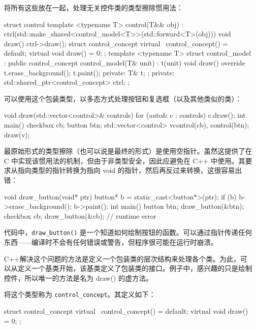 将所有这些放在一起，处理无关控件类的类型擦除惯用法：

\begin{cpp}
struct control
{
    template <typename T>
    control(T&& obj) :
    ctrl(std::make_shared<control_model<T>>(std::forward<T>(obj)))
    {
    }
    void draw()
    {
        ctrl->draw();
    }
    struct control_concept
    {
        virtual ~control_concept() = default;
        virtual void draw() = 0;
    };
    template <typename T>
    struct control_model : public control_concept
    {
        control_model(T& unit) : t(unit) {}
        void draw() override
        {
            t.erase_background();
            t.paint();
        }
        private:
        T& t;
    };
private:
    std::shared_ptr<control_concept> ctrl;
};
\end{cpp}

可以使用这个包装类型，以多态方式处理按钮和复选框（以及其他类似的类）：

\begin{cpp}
void draw(std::vector<control>& controls)
{
    for (auto& c : controls)
    {
        c.draw();
    }
}
int main()
{
    checkbox cb;
    button btn;
    std::vector<control> v{control(cb), control(btn)};
    draw(v);
}
\end{cpp}


最原始形式的类型擦除（也可以说是最终的形式）是使用空指针。虽然这提供了在 C 中实现该惯用法的机制，但由于非类型安全，因此应避免在 C++ 中使用。其要求从指向类型的指针转换为指向 void 的指针，然后再反过来转换，这很容易出错：

\begin{cpp}
void draw_button(void* ptr)
{
    button* b = static_cast<button*>(ptr);
    if (b)
    {
        b->erase_background();
        b->paint();
    }
}
int main()
{
    button btn;
    draw_button(&btn);
    checkbox cb;
    draw_button(&cb); // runtime error
}
\end{cpp}

代码中，\verb|draw_button()| 是一个知道如何绘制按钮的函数。可以通过指针传递任何东西——编译时不会有任何错误或警告，但程序很可能在运行时崩溃。

C++解决这个问题的方法是定义一个包装类的层次结构来处理各个类。为此，可以从定义一个基类开始，该基类定义了包装类的接口。例子中，感兴趣的只是绘制控件，所以唯一的方法是名为 draw() 的虚方法。

将这个类型称为 \verb|control_concept|。其定义如下：

\begin{cpp}
struct control_concept
{
    virtual ~control_concept() = default;
    virtual void draw() = 0;
};
\end{cpp}

